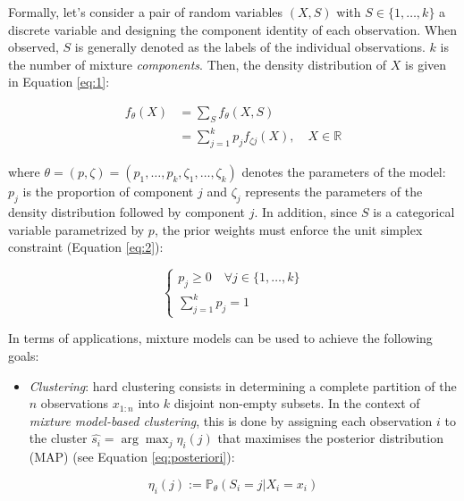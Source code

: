 Formally, let's consider a pair of random variables \((X,S)\) with \(S \in \{1, \ldots, k\}\) a discrete variable and designing
the component identity of each observation. When observed, \(S\) is
generally denoted as the labels of the individual observations. \(k\) is
the number of mixture \emph{components}. Then, the density distribution of
\(X\) is given in Equation \eqref{eq:1}:

\begin{equation}
\begin{split}
f_\theta(X) &= \sum_S f_\theta (X, S) \\
&= \sum_{j=1}^k p_j f_{\zeta j}(X), \quad X\in\mathbb{R}
\end{split}
\label{eq:1}
\end{equation}

where \(\theta = (p, \zeta) = (p_1, \ldots, p_k, \zeta_1, \ldots, \zeta_k)\)
denotes the parameters of the model: \(p_j\) is the proportion of
component \(j\) and \(\zeta_j\) represents the parameters of the density
distribution followed by component \(j\). In addition, since \(S\) is a categorical variable parametrized by \(p\), the prior weights must enforce the unit simplex constraint (Equation \eqref{eq:2}):

\begin{equation}
\begin{cases}
p_j \ge 0 \quad \forall j \in \{1, \ldots, k \}\\
\sum_{j=1}^k p_j =1
\end{cases}
\label{eq:2}
\end{equation}

In terms of applications, mixture models can be used to achieve the
following goals:

\begin{itemize}
\tightlist
\item
  \emph{Clustering}: hard clustering consists in determining a complete
  partition of the \(n\) observations \(x_{1:n}\) into \(k\) disjoint
  non-empty subsets. In the context of \emph{mixture model-based
  clustering}, this is done by assigning each observation \(i\) to the
  cluster \(\hat{s_i}=\arg \max_j \eta_{i} (j)\) that maximises the
  posterior distribution (MAP) (see Equation
  \eqref{eq:posteriori}):
\end{itemize}

\begin{equation}
        \eta_{i} (j) := \mathbb{P}_{\theta} (S_i=j |X_i=x_i)
    \label{eq:posteriori}
\end{equation}

